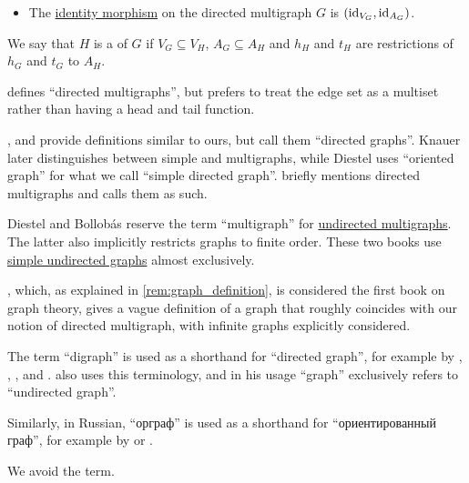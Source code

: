 \begin{definition}
\begin{thmenum}[resume=def:directed_multigraph]
\begin{itemize}
      \item The \hyperref[def:category/identity]{identity morphism} on the directed multigraph \( G \) is \( (\operatorname{id}_{V_G}, \operatorname{id}_{A_G}) \).
    \end{itemize}

    \mimprovised We say that \( H \) is a  of \( G \) if \( V_G \subseteq V_H \), \( A_G \subseteq A_H \) and \( h_H \) and \( t_H \) are restrictions of \( h_G \) and \( t_G \) to \( A_H \).
  \end{thmenum}
\end{definition}
\begin{comments}
  \item {} defines \enquote{directed multigraphs}, but prefers to treat the edge set as a multiset rather than having a head and tail function.

  ,  and  provide definitions similar to ours, but call them \enquote{directed graphs}. Knauer later distinguishes between simple and multigraphs, while Diestel uses \enquote{oriented graph} for what we call \enquote{simple directed graph}.  briefly mentions directed multigraphs and calls them as such.

  Diestel and Bollobás reserve the term \enquote{multigraph} for \hyperref[def:hypergraph/multigraph]{undirected multigraphs}. The latter also implicitly restricts graphs to finite order. These two books use \hyperref[def:undirected_graph]{simple undirected graphs} almost exclusively.

  , which, as explained in \cref{rem:graph_definition}, is considered the first book on graph theory, gives a vague definition of a graph that roughly coincides with our notion of directed multigraph, with infinite graphs explicitly considered.
\end{comments}

\begin{remark}\label{rem:digraph}
  The term \enquote{digraph} is used as a shorthand for \enquote{directed graph}, for example by , , ,  and .  also uses this terminology, and in his usage \enquote{graph} exclusively refers to \enquote{undirected graph}.

  Similarly, in Russian, \enquote{орграф} is used as a shorthand for \enquote{ориентированный граф}, for example by  or .

  We avoid the term.
\end{remark}

